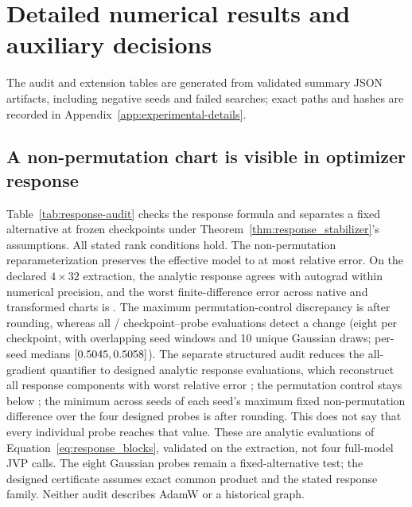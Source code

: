 \section{Detailed numerical results and auxiliary decisions}
\label{app:detailed-results}

The audit and extension tables are generated from validated summary JSON artifacts,
including negative seeds and failed searches; exact paths and hashes are
recorded in Appendix~\ref{app:experimental-details}.

\subsection{A non-permutation chart is visible in optimizer response}



Table~\ref{tab:response-audit} checks the response formula and separates
a fixed alternative at frozen checkpoints under
Theorem~\ref{thm:response_stabilizer}'s assumptions.  All stated rank conditions hold. The
non-permutation reparameterization preserves the effective model to at most
\ResponseEffectiveMax{} relative error.  On the declared $4\times32$
extraction, the analytic response agrees with autograd within numerical
precision, and the worst finite-difference error across native and transformed
charts is \ResponseFormulaMax{}.  The maximum permutation-control discrepancy
is \ResponsePermutationMax{} after rounding, whereas all
\ResponseProbeDetected{}/\ResponseProbeExpected{} checkpoint--probe
evaluations detect a change (eight per checkpoint, with overlapping seed
windows and 10 unique Gaussian draws; per-seed medians
$[0.5045{},0.5058{}]$).
The separate structured audit reduces the all-gradient quantifier to
\ResponseTomographyProbeCount{} designed analytic response evaluations, which
reconstruct all response components with worst relative error
\ResponseTomographyReconstructionMax{}; the
permutation control stays below \ResponseTomographyPermutationMax{}; the
minimum across seeds of each seed's maximum fixed non-permutation difference
over the four designed probes is \ResponseTomographyNonpermutationMin{} after
rounding.  This does not say that every individual probe reaches that value.
These are analytic evaluations of
Equation~\ref{eq:response_blocks}, validated on the extraction, not four
full-model JVP calls.  The eight Gaussian probes remain a fixed-alternative
test; the designed certificate assumes exact common product and the stated
response family.  Neither audit describes AdamW or a historical graph.


